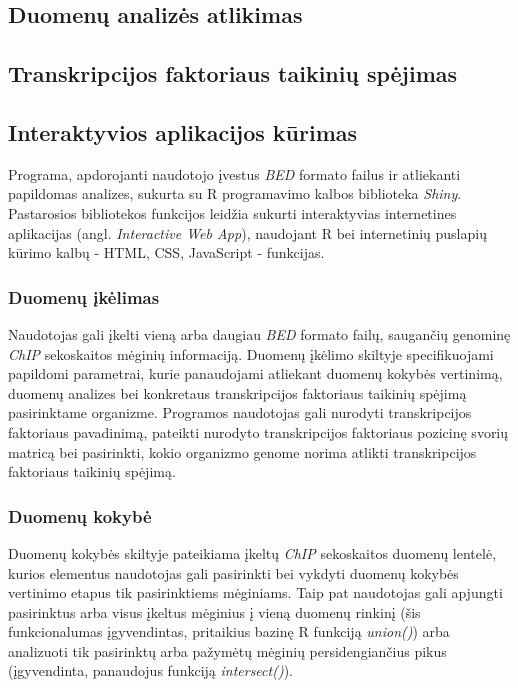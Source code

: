 \documentclass[12pt]{article}
\begin{document}
\subsection{Duomenų analizės atlikimas}

\subsection{Transkripcijos faktoriaus taikinių spėjimas}

\subsection{Interaktyvios aplikacijos kūrimas}

Programa, apdorojanti naudotojo įvestus \emph{BED} formato failus ir atliekanti
papildomas analizes, sukurta su R programavimo kalbos biblioteka
\emph{Shiny}\cite{SHINY}. Pastarosios bibliotekos funkcijos leidžia sukurti
interaktyvias internetines aplikacijas (angl. \emph{Interactive Web App}),
naudojant R bei internetinių puslapių kūrimo kalbų - HTML, CSS, JavaScript -
funkcijas.

\subsubsection*{Duomenų įkėlimas}
Naudotojas gali įkelti vieną arba daugiau \emph{BED} formato failų, saugančių
genominę \emph{ChIP} sekoskaitos mėginių informaciją. Duomenų įkėlimo skiltyje
specifikuojami papildomi parametrai, kurie panaudojami atliekant duomenų kokybės
vertinimą, duomenų analizes bei konkretaus transkripcijos faktoriaus taikinių
spėjimą pasirinktame organizme. Programos naudotojas gali nurodyti
transkripcijos faktoriaus pavadinimą, pateikti nurodyto transkripcijos
faktoriaus pozicinę svorių matricą bei pasirinkti, kokio organizmo genome
norima atlikti transkripcijos faktoriaus taikinių spėjimą.

\subsubsection*{Duomenų kokybė}
Duomenų kokybės skiltyje pateikiama įkeltų \emph{ChIP} sekoskaitos duomenų
lentelė, kurios elementus naudotojas gali pasirinkti bei vykdyti duomenų
kokybės vertinimo etapus tik pasirinktiems mėginiams. Taip pat naudotojas
gali apjungti pasirinktus arba visus įkeltus mėginius į vieną duomenų rinkinį
(šis funkcionalumas įgyvendintas, pritaikius bazinę R funkciją \emph{union()})
arba analizuoti tik pasirinktų arba pažymėtų mėginių persidengiančius pikus
(įgyvendinta, panaudojus funkciją \emph{intersect()}).
\end{document}
